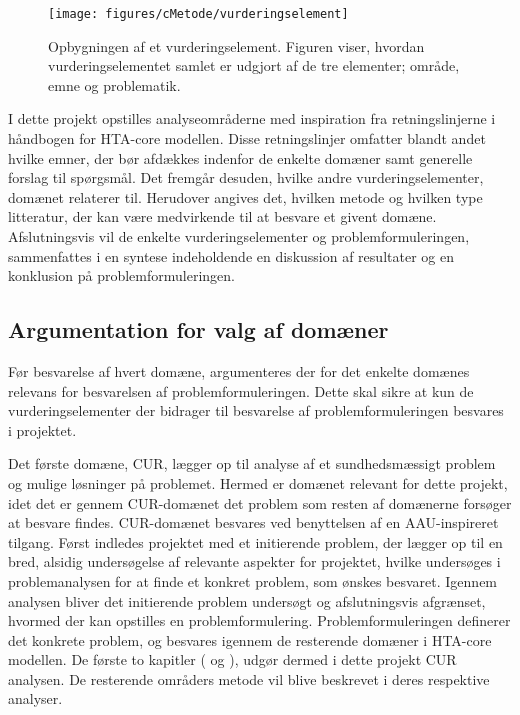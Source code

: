 \begin{figure}[H] 
\begin{center}
\texttt{[image: figures/cMetode/vurderingselement]}
\end{center}
\caption{Opbygningen af et vurderingselement. Figuren viser, hvordan vurderingselementet samlet er udgjort af de tre elementer; område, emne og problematik.}
\label{fig:vurderingselement} 
\end{figure}

I dette projekt opstilles analyseområderne med inspiration fra retningslinjerne i håndbogen for HTA-core modellen. Disse retningslinjer omfatter blandt andet hvilke emner, der bør afdækkes indenfor de enkelte domæner samt generelle forslag til spørgsmål. Det fremgår desuden, hvilke andre vurderingselementer, domænet relaterer til. Herudover angives det, hvilken metode og hvilken type litteratur, der kan være medvirkende til at besvare et givent domæne. \citep{HTAcore} \\
Afslutningsvis vil de enkelte vurderingselementer og problemformuleringen, sammenfattes i en syntese indeholdende en diskussion af resultater og en konklusion på problemformuleringen. 

\subsection{Argumentation for valg af domæner}
Før besvarelse af hvert domæne, argumenteres der for det enkelte domænes relevans for besvarelsen af problemformuleringen. Dette skal sikre at kun de vurderingselementer der bidrager til besvarelse af problemformuleringen besvares i projektet. 

Det første domæne, CUR, lægger op til analyse af et sundhedsmæssigt problem og mulige løsninger på problemet. Hermed er domænet relevant for dette projekt, idet det er gennem CUR-domænet det problem som resten af domænerne forsøger at besvare findes. CUR-domænet besvares ved benyttelsen af en AAU-inspireret tilgang. Først indledes projektet med et initierende problem, der lægger op til en bred, alsidig undersøgelse af relevante aspekter for projektet, hvilke undersøges i problemanalysen for at finde et konkret problem, som ønskes besvaret. Igennem analysen bliver det initierende problem undersøgt og afslutningsvis afgrænset, hvormed der kan opstilles en problemformulering. Problemformuleringen definerer det konkrete problem, og besvares igennem de resterende domæner i HTA-core modellen. De første to kapitler ( og ), udgør dermed i dette projekt CUR analysen. De resterende områders metode vil blive beskrevet i deres respektive analyser. 

